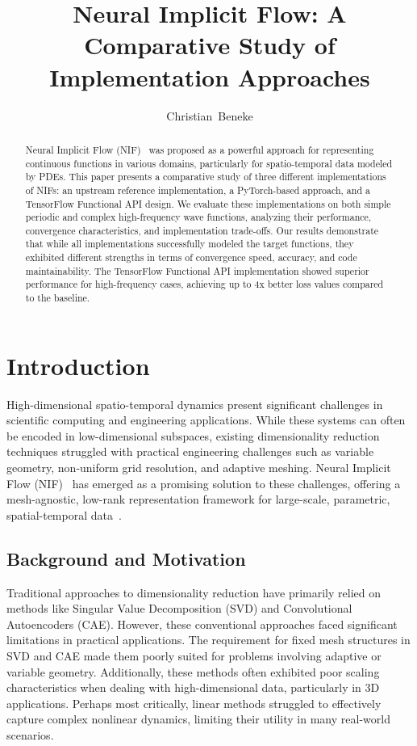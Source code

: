 \documentclass[10pt,journal,compsoc,onecolumn]{IEEEtran}
\begin{document}
\title{Neural Implicit Flow: A Comparative Study of Implementation Approaches}

\author{Christian~Beneke}

\maketitle

\begin{abstract}
Neural Implicit Flow (NIF)~\cite{nif2023} was proposed as a powerful approach for representing continuous functions in various domains, particularly for spatio-temporal data modeled by PDEs. This paper presents a comparative study of three different implementations of NIFs: an upstream reference implementation, a PyTorch-based approach, and a TensorFlow Functional API design. We evaluate these implementations on both simple periodic and complex high-frequency wave functions, analyzing their performance, convergence characteristics, and implementation trade-offs. Our results demonstrate that while all implementations successfully modeled the target functions, they exhibited different strengths in terms of convergence speed, accuracy, and code maintainability. The TensorFlow Functional API implementation showed superior performance for high-frequency cases, achieving up to 4x better loss values compared to the baseline.
\end{abstract}

\section{Introduction}
High-dimensional spatio-temporal dynamics present significant challenges in scientific computing and engineering applications. While these systems can often be encoded in low-dimensional subspaces, existing dimensionality reduction techniques struggled with practical engineering challenges such as variable geometry, non-uniform grid resolution, and adaptive meshing. Neural Implicit Flow (NIF)~\cite{nif2023} has emerged as a promising solution to these challenges, offering a mesh-agnostic, low-rank representation framework for large-scale, parametric, spatial-temporal data~\cite{neural_fields2022}.

\subsection{Background and Motivation}
Traditional approaches to dimensionality reduction have primarily relied on methods like Singular Value Decomposition (SVD) and Convolutional Autoencoders (CAE). However, these conventional approaches faced significant limitations in practical applications. The requirement for fixed mesh structures in SVD and CAE made them poorly suited for problems involving adaptive or variable geometry. Additionally, these methods often exhibited poor scaling characteristics when dealing with high-dimensional data, particularly in 3D applications. Perhaps most critically, linear methods struggled to effectively capture complex nonlinear dynamics, limiting their utility in many real-world scenarios.~\cite{nif2023}
\end{document}

